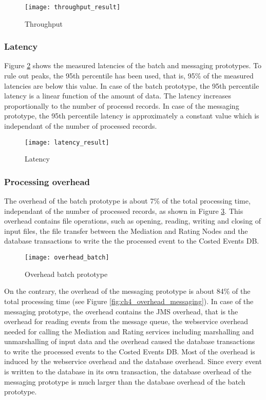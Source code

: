 \begin{figure}[htbp]
	\centering
	\texttt{[image: throughput\_result]}
	\caption{Throughput}
	\label{fig:ch4_result_throughput}
\end{figure}

\subsubsection{Latency}\label{sec:result_latency}

Figure \ref{fig:ch4_result_latency} shows the measured latencies of the batch and messaging prototypes. To rule out peaks, the 95th percentile has been used, that is, 95\% of the measured latencies are below this value. In case of the batch prototype, the 95th percentile latency is a linear function of the amount of data. The latency increases proportionally to the number of processd records. In case of the messaging prototype, the 95th percentile latency is approximately a constant value which is independant of the number of processed records.

\begin{figure}[htbp]
	\centering
	\texttt{[image: latency\_result]}
	\caption{Latency}
	\label{fig:ch4_result_latency}
\end{figure}

\subsubsection{Processing overhead}

The overhead of the batch prototype is about 7\% of the total processing time, independant of the number of processed records, as shown in Figure \ref{fig:ch4_overhead_batch}. This overhead contains file operations, such as opening, reading, writing and closing of input files, the file transfer between the Mediation and Rating Nodes and the database transactions to write the the processed event to the Costed Events DB.

\begin{figure}[htbp]
	\centering
	\texttt{[image: overhead\_batch]}
	\caption{Overhead batch prototype}
	\label{fig:ch4_overhead_batch}
\end{figure}

On the contrary, the overhead of the messaging prototype is about 84\% of the total processing time (see Figure \ref{fig:ch4_overhead_messaging}). In case of the messaging prototype, the overhead contains the JMS overhead, that is the overhead for reading events from the message queue, the webservice overhead needed for calling the Mediation and Rating services including marshalling and unmarshalling of input data and the overhead caused the database transactions to write the processed events to the Costed Events DB. Most of the overhead is induced by the webservice overhead and the database overhead. Since every event is written to the database in its own transaction, the database overhead of the messaging prototype is much larger than the database overhead of the batch prototype.

